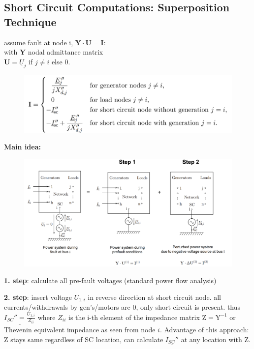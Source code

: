 \documentclass[a4paper,10pt,landscape]{scrartcl}
\begin{document}
\begin{multicols*}{3}
\subsection{Short Circuit Computations: Superposition Technique}
assume fault at node i, $\mathbf{Y\cdot U = I}$: \\
with $\mathbf{Y}$ nodal admittance matrix \\
$\mathbf{U} = \underline{U}_j$ if $j\neq i$ else $0$. \\
\begin{figure}[H]
    \centering
    \includegraphics[width=1\linewidth]{src/SC_computation_I.png}
\end{figure}
\textbf{Main idea:}
\begin{figure}[H]
    \centering
    \includegraphics[width=1\linewidth]{src/superposition_tech_SC.png}
\end{figure}
\textbf{1. step}: calculate all pre-fault voltages (standard power flow analysis)

\textbf{2. step}: insert voltage $U_{1,i}$ in reverse direction at short circuit node. all currents/withdrawals by gen's/motors are 0, only short circuit is present. thus $\underline{I_{SC}'' = \frac{U_{1,i}}{Z_{ii}}}$ where $Z_{ii}$ is the i-th element of the impedance matrix $\mathrm{Z=Y^{-1}}$ or Thevenin equivalent impedance as seen from node $i$. Advantage of this approach: $\mathrm{Z}$ stays same regardless of SC location, can calculate $\underline{I_{SC}''}$ at any location with $\mathrm{Z}$.


\end{multicols*}
\end{document}
